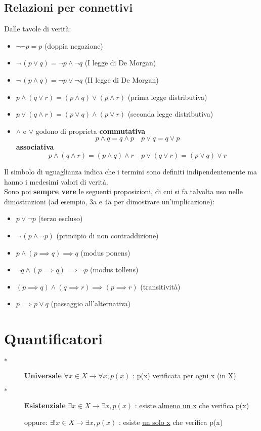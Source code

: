 \documentclass[10pt, oneside]{book}
\theoremstyle{plain}
\begin{document}
\subsection{Relazioni per connettivi}
Dalle tavole di verità:
\begin{itemize}
\item $\neg  \neg  p = p$ (doppia negazione)
\item $\neg \, (p \lor q) = \neg p \land \neg q$ (I legge di De Morgan)
\item $\neg \, (p \land q) = \neg p \lor \neg q$ (II legge di De Morgan)
\item $p \land (q \lor r) = (p \land q) \lor (p \land r)$ (prima legge distributiva)
\item $p \lor (q \land r) = (p \lor q) \land (p \lor r)$ (seconda legge distributiva)
\item $\land$ e $\lor$ godono di proprieta \textbf{commutativa}
\[p \land q = q \land p \quad p \lor q = q \lor p\]
\textbf{associativa}
\[p \land (q \land r) = (p \land q) \land r \quad p \lor (q \lor r) = (p \lor q) \lor r\]
\end{itemize}
Il simbolo di uguaglianza indica che i termini sono definiti indipendentemente ma hanno i medesimi valori di verità.
\\Sono poi \textbf{sempre vere} le seguenti proposizioni, di cui si fa talvolta uso nelle dimostrazioni (ad esempio, 3a e 4a per dimostrare un'implicazione):
\begin{itemize}
\item $p \lor \neg p$ (terzo escluso)
\item $\neg \, (p \land \neg p)$ (principio di non contraddizione)
\item $p \land (p \implies q) \implies q$ (modus ponens)
\item $\neg q \land (p \implies q) \implies \neg p$ (modus tollens)
\item $(p \implies q) \land (q \implies r) \implies (p \implies r)$ (transitività)
\item $p \implies p \lor q$ (passaggio all'alternativa)
\end{itemize}

\section{Quantificatori}
\begin{description}
   \item[$\ast$] \textbf{Universale} $\forall  x \in X \longrightarrow \forall x, p(x)$ : p(x) verificata per ogni x (in X)
   \item[$\ast$] \textbf{Esistenziale} $\exists  x \in X \longrightarrow \exists x, p(x)$ : esiste \underline{almeno un x} che verifica p(x)
    \item[] oppure: $\exists!  x \in X \longrightarrow \exists x, p(x)$ : esiste \underline{un solo x} che verifica p(x)
\end{description}
\end{document}
